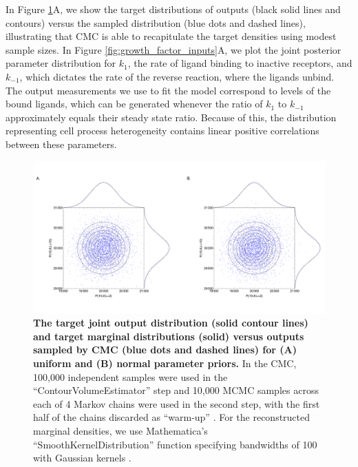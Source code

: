 \documentclass[10pt,letterpaper]{article}
\begin{document}
In Figure \ref{fig:growth_factor_outputs}A, we show the target distributions of outputs (black solid lines and contours) versus the sampled distribution (blue dots and dashed lines), illustrating that CMC is able to recapitulate the target densities using modest sample sizes. In Figure \ref{fig:growth_factor_inputs}A, we plot the joint posterior parameter distribution for $k_1$, the rate of ligand binding to inactive receptors, and $k_{-1}$, which dictates the rate of the reverse reaction, where the ligands unbind. The output measurements we use to fit the model correspond to levels of the bound ligands, which can be generated whenever the ratio of $k_1$ to $k_{-1}$ approximately equals their steady state ratio. Because of this, the distribution representing cell process heterogeneity contains linear positive correlations between these parameters.

\begin{figure}[H]
	\centerline{\includegraphics[width=\textwidth]{../figures/growth_factor_outputs.pdf}}
	\caption{\textbf{The target joint output distribution (solid contour lines) and target marginal distributions (solid) versus outputs sampled by CMC (blue dots and dashed lines) for (A) uniform and (B) normal parameter priors.} In the CMC, 100,000 independent samples were used in the ``ContourVolumeEstimator'' step and 10,000 MCMC samples across each of 4 Markov chains were used in the second step, with the first half of the chains discarded as ``warm-up'' \cite{lambert2018Student}. For the reconstructed marginal densities, we use Mathematica's ``SmoothKernelDistribution'' function specifying bandwidths of 100 with Gaussian kernels \cite{mathematica}.}
	\label{fig:growth_factor_outputs}
\end{figure}
\end{document}
